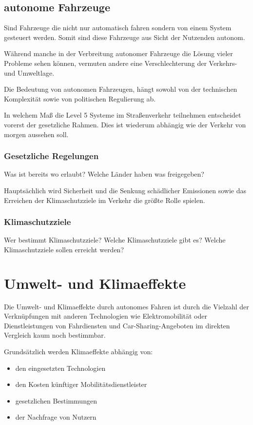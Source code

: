 


\section{autonome Fahrzeuge}
Sind Fahrzeuge die nicht nur automatisch fahren sondern von einem System gesteuert werden.
Somit sind diese Fahrzeuge aus Sicht der Nutzenden autonom.

Während manche in der Verbreitung autonomer Fahrzeuge die Lösung vieler Probleme sehen können,
vermuten andere eine Verschlechterung der Verkehrs- und Umweltlage.

Die Bedeutung von autonomen Fahrzeugen, hängt sowohl von der technischen Komplexität sowie von politischen Regulierung ab.

In welchem Maß die Level 5 Systeme im Straßenverkehr teilnehmen entscheidet vorerst der gesetzliche Rahmen.
Dies ist wiederum abhängig wie der Verkehr von morgen aussehen soll.
\subsection{Gesetzliche Regelungen}
Was ist bereits wo erlaubt?
Welche Länder haben was freigegeben?


Hauptsächlich wird Sicherheit und die Senkung schädlicher Emissionen sowie das Erreichen der
Klimaschutzziele im Verkehr die größte Rolle spielen.
\subsection{Klimaschutzziele}
Wer bestimmt Klimaschutzziele?
Welche Klimaschutzziele gibt es?
Welche Klimaschutzziele sollen erreicht werden?



\newpage

\chapter{Umwelt- und Klimaeffekte}
Die Umwelt- und Klimaeffekte durch autonomes Fahren ist durch die Vielzahl der Verknüpfungen mit anderen Technologien wie Elektromobilität
oder Dienstleistungen von Fahrdiensten und Car-Sharing-Angeboten im direkten Vergleich kaum noch bestimmbar.

Grundsätzlich werden Klimaeffekte abhängig von:
\begin{itemize}
	\item den eingesetzten Technologien
	\item den Kosten künftiger Mobilitätsdienstleister
	\item gesetzlichen Bestimmungen
	\item der Nachfrage von Nutzern
\end{itemize}

